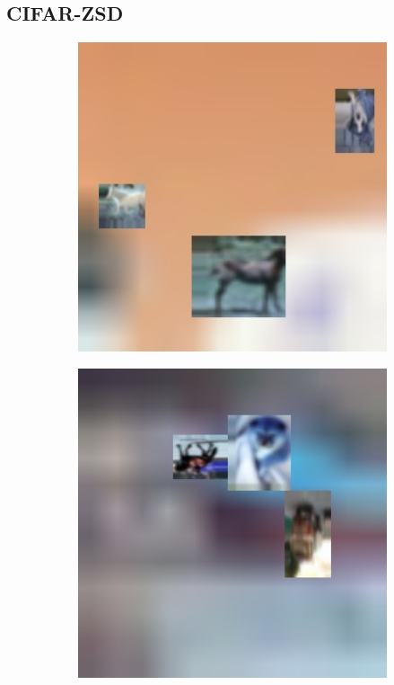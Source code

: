 \subsection{CIFAR-ZSD} \label{ssec:cifarzsd}
\begin{figure}[]
	\begin{center}
		\begin{subfigure}{.3\textwidth}
			\includegraphics[width=1\textwidth]{img/cifar-zsd-test400.jpg}
			\label{fig:ex1}
		\end{subfigure}
		\begin{subfigure}{.3\textwidth}
			\includegraphics[width=1\textwidth]{img/cifar-zsd-test379.jpg}

\end{subfigure}
\end{center}
\end{figure}
